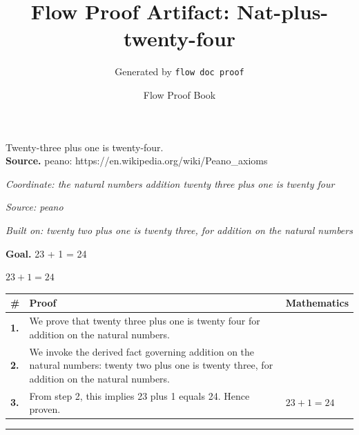 \documentclass[11pt]{article}
\title{Flow Proof Artifact: Nat-plus-twenty-four}
\author{Generated by \texttt{flow doc proof}}
\date{Flow Proof Book}
\theoremstyle{definition}
\begin{document}
\maketitle
Twenty-three plus one is twenty-four.\\[0.5em]
\textbf{Source.} peano: https://en.wikipedia.org/wiki/Peano\_axioms\\[0.5em]
\bigskip
{}\par
\smallskip\noindent\textit{Coordinate: the natural numbers \cdot addition \cdot twenty three plus one is twenty four}\par
\smallskip\noindent\textit{Source: peano}\par
\smallskip\noindent\textit{Built on: twenty two plus one is twenty three, for addition on the natural numbers}\par
\medskip
\noindent\textbf{Goal.} 23 + 1 = 24\par
\noindent$\displaystyle 23 + 1 = 24$\par
\medskip
\noindent
\begin{tabular}{@{} >{\raggedright\arraybackslash}p{} >{\raggedright\arraybackslash}p{} >{\raggedleft\arraybackslash}p{} @{}}
\textbf{\#} & \textbf{Proof} & \textbf{Mathematics} \\
\midrule
\textbf{1.} & We prove that twenty three plus one is twenty four for addition on the natural numbers. & \\[0.45em]
\textbf{2.} & We invoke the derived fact governing addition on the natural numbers: twenty two plus one is twenty three, for addition on the natural numbers. & \\[0.45em]
\textbf{3.} & From step 2, this implies 23 plus 1 equals 24. Hence proven. & $\displaystyle 23 + 1 = 24$ \\[0.45em]
\bottomrule
\end{tabular}
\label{thm:Nat-addition-twenty_three_plus_one_is_twenty_four}
\par\medskip\hrule
\end{document}
